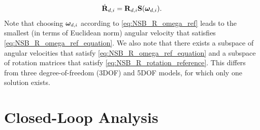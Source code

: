 \begin{equation}
    \dot{\mathbf{R}}_{d, i} = \mathbf{R}_{d, i} \mathbf{S}(\bm{\omega}_{d, i}).
\end{equation}
Note that choosing $\bm{\omega}_{d, i}$ according to \eqref{eq:NSB_R_omega_ref} leads to the smallest (in terms of Euclidean norm) angular velocity that satisfies \eqref{eq:NSB_R_omega_ref_equation}.
We also note that there exists a subspace of angular velocities that satisfy \eqref{eq:NSB_R_omega_ref_equation} and a subspace of rotation matrices that satisfy \eqref{eq:NSB_R_rotation_reference}.
This differs from three degree-of-freedom (3DOF) \cite{eek_formation_2021,arrichiello_formation_2006} and 5DOF \cite{matouvs_formation_2022} models, for which only one solution exists.


\section{Closed-Loop Analysis}
\label{sec:NSB_R_path_stability}

